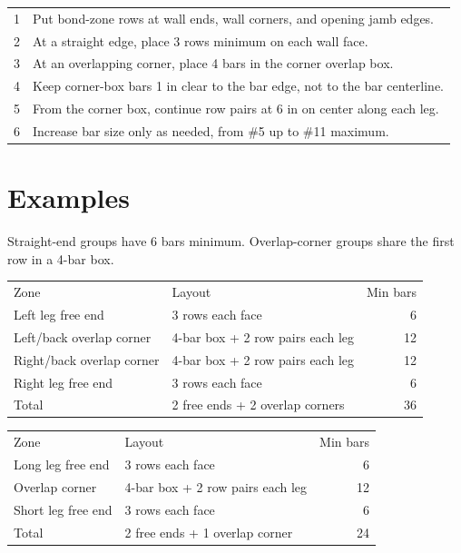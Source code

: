 \documentclass[10pt]{article}
\begin{document}
{\ttfamily\footnotesize
\begin{tabular}{@{}p{0.35in}p{6.35in}@{}}
1 & Put bond-zone rows at wall ends, wall corners, and opening jamb edges. \\
2 & At a straight edge, place 3 rows minimum on each wall face. \\
3 & At an overlapping corner, place 4 bars in the corner overlap box. \\
4 & Keep corner-box bars 1 in clear to the bar edge, not to the bar centerline. \\
5 & From the corner box, continue row pairs at 6 in on center along each leg. \\
6 & Increase bar size only as needed, from \#5 up to \#11 maximum. \\
\end{tabular}
}

\section{Examples}

Straight-end groups have 6 bars minimum. Overlap-corner groups share the first row in a 4-bar box.


{\ttfamily\footnotesize
\begin{tabular}{@{}p{2.25in}p{3.05in}r@{}}
Zone & Layout & Min bars \\
Left leg free end & 3 rows each face & 6 \\
Left/back overlap corner & 4-bar box + 2 row pairs each leg & 12 \\
Right/back overlap corner & 4-bar box + 2 row pairs each leg & 12 \\
Right leg free end & 3 rows each face & 6 \\
Total & 2 free ends + 2 overlap corners & 36 \\
\end{tabular}
}


{\ttfamily\footnotesize
\begin{tabular}{@{}p{2.25in}p{3.05in}r@{}}
Zone & Layout & Min bars \\
Long leg free end & 3 rows each face & 6 \\
Overlap corner & 4-bar box + 2 row pairs each leg & 12 \\
Short leg free end & 3 rows each face & 6 \\
Total & 2 free ends + 1 overlap corner & 24 \\
\end{tabular}
}
\end{document}
